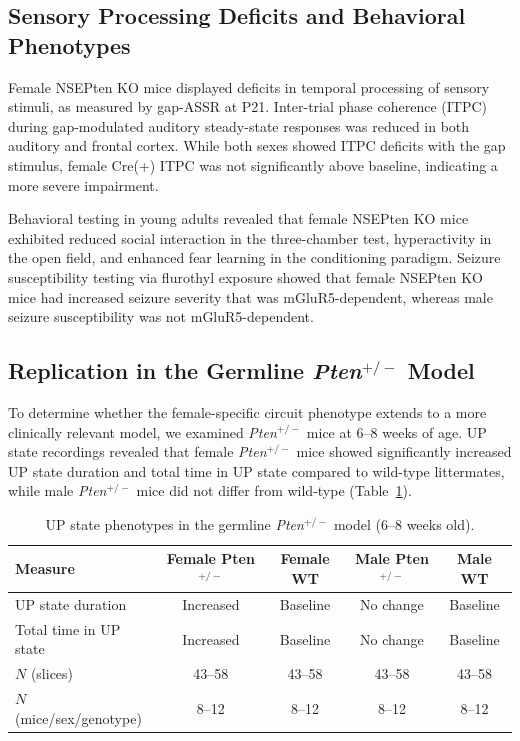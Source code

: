 \documentclass[11pt]{article}
\begin{document}
\subsection{Sensory Processing Deficits and Behavioral Phenotypes}

Female NSEPten KO mice displayed deficits in temporal processing of sensory stimuli, as measured by gap-ASSR at P21. Inter-trial phase coherence (ITPC) during gap-modulated auditory steady-state responses was reduced in both auditory and frontal cortex. While both sexes showed ITPC deficits with the gap stimulus, female Cre(+) ITPC was not significantly above baseline, indicating a more severe impairment.

Behavioral testing in young adults revealed that female NSEPten KO mice exhibited reduced social interaction in the three-chamber test, hyperactivity in the open field, and enhanced fear learning in the conditioning paradigm. Seizure susceptibility testing via flurothyl exposure showed that female NSEPten KO mice had increased seizure severity that was mGluR5-dependent, whereas male seizure susceptibility was not mGluR5-dependent.

\subsection{Replication in the Germline \textit{Pten}$^{+/-}$ Model}

To determine whether the female-specific circuit phenotype extends to a more clinically relevant model, we examined \textit{Pten}$^{+/-}$ mice at 6--8 weeks of age. UP state recordings revealed that female \textit{Pten}$^{+/-}$ mice showed significantly increased UP state duration and total time in UP state compared to wild-type littermates, while male \textit{Pten}$^{+/-}$ mice did not differ from wild-type (Table~\ref{tab:germline}).

\begin{table}[htbp]
\centering
\caption{UP state phenotypes in the germline \textit{Pten}$^{+/-}$ model (6--8 weeks old).}
\label{tab:germline}
\begin{tabular}{lcccc}
\toprule
Measure & Female Pten$^{+/-}$ & Female WT & Male Pten$^{+/-}$ & Male WT \\
\midrule
UP state duration & Increased & Baseline & No change & Baseline \\
Total time in UP state & Increased & Baseline & No change & Baseline \\
$N$ (slices) & 43--58 & 43--58 & 43--58 & 43--58 \\
$N$ (mice/sex/genotype) & 8--12 & 8--12 & 8--12 & 8--12 \\
\bottomrule
\end{tabular}
\end{table}
\end{document}
